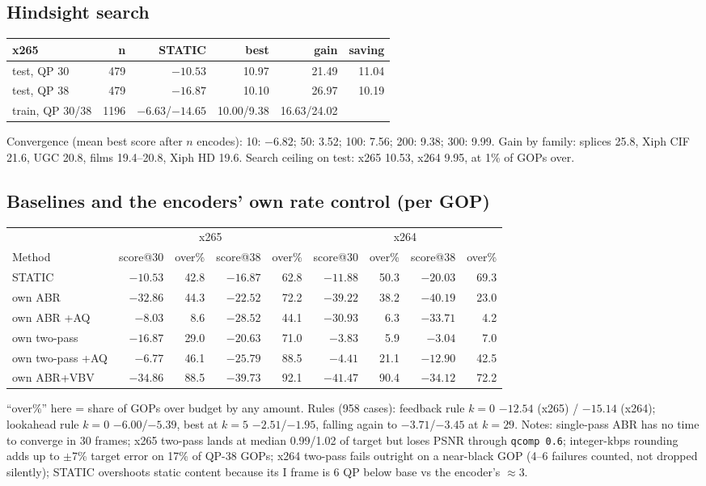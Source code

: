 \documentclass[10pt,a4paper]{article}
\newcommand{\code}[1]{\texttt{\small #1}}
\begin{document}
\subsection{Hindsight search}
\begin{center}\small
\begin{tabular}{lrrrrr}
\toprule
x265 & n & STATIC & best & gain & saving \\\midrule
test, QP 30 & 479 & $-10.53$ & 10.97 & 21.49 & 11.04 \\
test, QP 38 & 479 & $-16.87$ & 10.10 & 26.97 & 10.19 \\
train, QP 30/38 & 1196 & $-6.63$/$-14.65$ & 10.00/9.38 & 16.63/24.02 & \\
\bottomrule
\end{tabular}
\end{center}
Convergence (mean best score after $n$ encodes): 10: $-6.82$; 50: 3.52; 100: 7.56; 200: 9.38; 300: 9.99. Gain by family:
splices 25.8, Xiph CIF 21.6, UGC 20.8, films 19.4--20.8, Xiph HD 19.6. Search ceiling on test: x265 10.53, x264 9.95,
at 1\% of GOPs over.

\subsection{Baselines and the encoders' own rate control (per GOP)}
\begin{center}\small
\begin{tabular}{lrrrr|rrrr}
\toprule
& \multicolumn{4}{c|}{x265} & \multicolumn{4}{c}{x264}\\
Method & score@30 & over\% & score@38 & over\% & score@30 & over\% & score@38 & over\% \\\midrule
STATIC & $-10.53$ & 42.8 & $-16.87$ & 62.8 & $-11.88$ & 50.3 & $-20.03$ & 69.3 \\
own ABR & $-32.86$ & 44.3 & $-22.52$ & 72.2 & $-39.22$ & 38.2 & $-40.19$ & 23.0 \\
own ABR +AQ & $-8.03$ & 8.6 & $-28.52$ & 44.1 & $-30.93$ & 6.3 & $-33.71$ & 4.2 \\
own two-pass & $-16.87$ & 29.0 & $-20.63$ & 71.0 & $-3.83$ & 5.9 & $-3.04$ & 7.0 \\
own two-pass +AQ & $-6.77$ & 46.1 & $-25.79$ & 88.5 & $-4.41$ & 21.1 & $-12.90$ & 42.5 \\
own ABR+VBV & $-34.86$ & 88.5 & $-39.73$ & 92.1 & $-41.47$ & 90.4 & $-34.12$ & 72.2 \\
\bottomrule
\end{tabular}
\end{center}
``over\%'' here = share of GOPs over budget by any amount. Rules (958 cases): feedback rule $k=0$ $-12.54$ (x265) /
$-15.14$ (x264); lookahead rule $k=0$ $-6.00$/$-5.39$, best at $k=5$ $-2.51$/$-1.95$, falling again to $-3.71$/$-3.45$ at
$k=29$. Notes: single-pass ABR has no time to converge in 30 frames; x265 two-pass lands at median 0.99/1.02 of target
but loses PSNR through \code{qcomp 0.6}; integer-kbps rounding adds up to $\pm$7\% target error on 17\% of QP-38 GOPs;
x264 two-pass fails outright on a near-black GOP (4--6 failures counted, not dropped silently); STATIC overshoots
static content because its I frame is 6 QP below base vs the encoder's $\approx$3.
\end{document}
